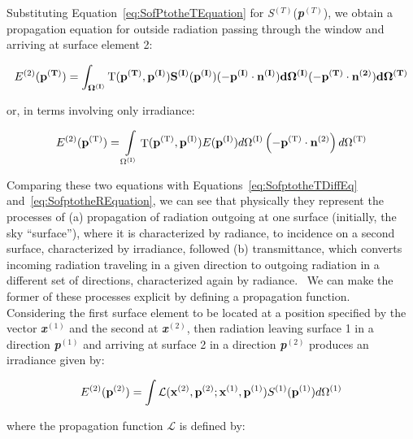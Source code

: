 Substituting Equation~\ref{eq:SofPtotheTEquation} for \emph{S}\(^{(T)}\)(\textbf{\emph{p}}\(^{(T)}\)), we obtain a propagation equation for outside radiation passing through the window and arriving at surface element 2:

\begin{equation}
E^{(2)}(\bf{p}^{(T)}) = \int_{\Omega^{(I)}}
      \rm T (\bf{p}^{(T)},\bf{p}^{(I)})
      S^{(I)}(\bf{p}^{(I)})(-\bf{p}^{(I)}\cdot\bf{n}^{(I)})
      d\Omega^{(I)}(-\bf{p}^{(T)}\cdot\bf{n}^{(2)})d\Omega^{(T)}
\end{equation}

or, in terms involving only irradiance:

\begin{equation}
{E^{{\rm{(2)}}}}({{\bf{p}}^{{\rm{(T)}}}}) = \int\limits_{{\Omega ^{{\rm{(I)}}}}} {{\mathop{\rm T}\nolimits} ({{\bf{p}}^{{\rm{(T)}}}},{{\bf{p}}^{{\rm{(I)}}}})E({{\bf{p}}^{{\rm{(I)}}}})d{\Omega ^{{\rm{(I)}}}}} \left( { - {{\bf{p}}^{{\rm{(T)}}}} \cdot {{\bf{n}}^{{\rm{(2)}}}}} \right)d{\Omega ^{{\rm{(T)}}}}
\end{equation}

Comparing these two equations with Equations~\ref{eq:SofptotheTDiffEq} and~\ref{eq:SofptotheREquation}, we can see that physically they represent the processes of (a) propagation of radiation outgoing at one surface (initially, the sky ``surface''), where it is characterized by radiance, to incidence on a second surface, characterized by irradiance, followed (b) transmittance, which converts incoming radiation traveling in a given direction to outgoing radiation in a different set of directions, characterized again by radiance.~ We can make the former of these processes explicit by defining a propagation function.~ Considering the first surface element to be located at a position specified by the vector \textbf{\emph{x}}\(^{(1)}\) and the second at \textbf{\emph{x}}\(^{(2)}\), then radiation leaving surface 1 in a direction \textbf{\emph{p}}\(^{(1)}\) and arriving at surface 2 in a direction \textbf{\emph{p}}\(^{(2)}\) produces an irradiance given by:

\begin{equation}
{E^{(2)}}({{\bf{p}}^{{\rm{(2)}}}}) = \int {\mathcal{L}({{\bf{x}}^{{\rm{(2)}}}},{{\bf{p}}^{{\rm{(2)}}}};{{\bf{x}}^{{\rm{(1)}}}},{{\bf{p}}^{{\rm{(1)}}}}){S^{{\rm{(1)}}}}({{\bf{p}}^{{\rm{(1)}}}})} d{\Omega ^{{\rm{(1)}}}}
\label{eq:E2p2Equation}
\end{equation}

where the propagation function $\mathcal{L}$ is defined by:

